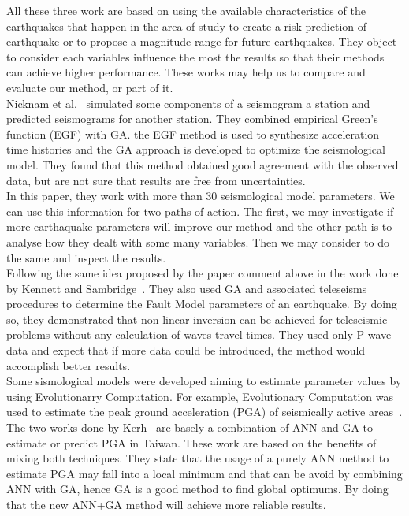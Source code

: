 All these three work are based on using the available characteristics of the earthquakes that happen in the area of study to create a risk prediction of earthquake or to propose a magnitude range for future earthquakes. They object to consider each variables influence the most the results so that their methods can achieve higher performance. These works may help us to compare and evaluate our method, or part of it.\\

Nicknam et al.~\cite{Nicknam2010} simulated some components of a seismogram a station and predicted seismograms for another station. They combined  empirical Green’s function (EGF) with GA. the EGF method is used to synthesize acceleration time histories and the GA approach is developed to optimize the seismological model. They found that this method obtained good agreement with the observed data, but are not sure that results are free from uncertainties.\\

In this paper, they work with more than 30 seismological model parameters. We can use this information for two paths of action. The first, we may investigate if more earthaquake parameters will improve our method and the other path is to analyse how they dealt with some many variables. Then we may consider to do the same and inspect the results.\\  

Following the same idea proposed by the paper comment above in the work done by Kennett and Sambridge~\cite{Kennett1992}. They also used GA and associated teleseisms procedures to determine the Fault Model parameters of an earthquake. By doing so, they demonstrated that non-linear inversion can be achieved for teleseismic problems without any calculation of waves travel times. They used only P-wave data and expect that if more data could be introduced, the method would accomplish better results.\\

Some sismological models were developed aiming to estimate parameter values by using Evolutionarry Computation. For example, Evolutionary Computation was used to estimate the peak ground acceleration (PGA) of seismically active areas~\cite{Kermani2009,Cabalar2009,Kerh2010,Kerh2015}. \\

The two works done by Kerh~\cite{Kerh2010, Kerh2015} are basely a combination of ANN and GA to estimate or predict PGA in Taiwan. These work are based on the benefits of mixing both techniques. They state that the usage of a purely ANN method to estimate PGA may fall into a local minimum and that can be avoid by combining ANN with GA, hence GA is a good method to find global optimums. By doing that the new ANN+GA method will achieve more reliable results.\\

